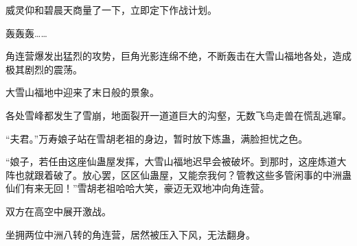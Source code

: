 \begin{this_body}
威灵仰和碧晨天商量了一下，立即定下作战计划。

轰轰轰……

角连营爆发出猛烈的攻势，巨角光影连绵不绝，不断轰击在大雪山福地各处，造成极其剧烈的震荡。

大雪山福地中迎来了末日般的景象。

各处雪峰都发生了雪崩，地面裂开一道道巨大的沟壑，无数飞鸟走兽在慌乱逃窜。

“夫君。”万寿娘子站在雪胡老祖的身边，暂时放下炼蛊，满脸担忧之色。

“娘子，若任由这座仙蛊屋发挥，大雪山福地迟早会被破坏。到那时，这座炼道大阵也就跟着破了。放心罢，区区仙蛊屋，又能奈我何？管教这些多管闲事的中洲蛊仙们有来无回！”雪胡老祖哈哈大笑，豪迈无双地冲向角连营。

双方在高空中展开激战。

坐拥两位中洲八转的角连营，居然被压入下风，无法翻身。

\end{this_body}

